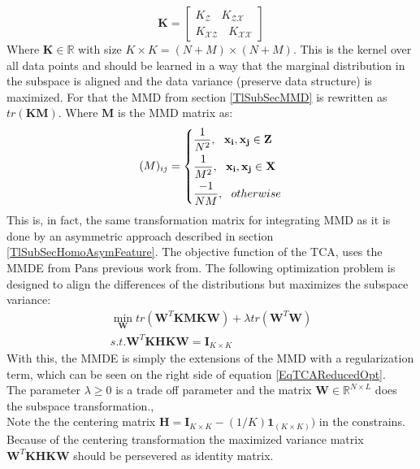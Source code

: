 \begin{equation}\label{EqTCAKernel}
\mathbf{K} = 
	\begin{bmatrix}
	K_{\mathcal{Z}}\>\>\>\> K_{\mathcal{ZX}} \\
	K_{\mathcal{XZ}}\>\>\>\> K_{\mathcal{XX}}
	\end{bmatrix}
\end{equation}
Where $\mathbf{K} \in \mathbb{R}$ with size $K\times K = (N + M) \times (N+ M)$.
This is the kernel over all data points and should be learned in a way that the marginal distribution in the subspace is aligned and the data variance (preserve data structure) is maximized.
For that the \acs{MMD} from section \ref{TlSubSecMMD} is rewritten as $tr(\mathbf{KM})$.
Where $\mathbf{M}$ is the \acs{MMD} matrix as:\cite{Pan.2011}
\begin{equation}\label{EqTCAMMD}
(M)_{ij}= \begin{dcases}
\frac{1}{N^2},\>\>\> \mathbf{x_i},\mathbf{x_j} \in \mathbf{Z}\\
\frac{1}{M^2},\>\>\> \mathbf{x_i},\mathbf{x_j} \in \mathbf{X}\\
\frac{-1}{NM},\>\>\> otherwise
\end{dcases}
\end{equation}
This is, in fact, the same transformation matrix for integrating \acs{MMD} as it is done by an asymmetric approach described in section \ref{TlSubSecHomoAsymFeature}.
The objective function of the \acs{TCA}, uses the \ac{MMDE} from Pans previous work from\cite{Pan.2008}. The following optimization problem is designed to align the differences of the distributions but maximizes the subspace variance:\cite{Pan.2011}
\begin{equation}\label{EqTCAReducedOpt}
\begin{gathered}
\min_{\mathbf{W}}  tr(\mathbf{W}^T\mathbf{KMKW}) + \lambda tr(\mathbf{W}^T\mathbf{W})\\
s.t. \mathbf{W}^T\mathbf{KHKW} = \mathbf{I}_{K \times K}
\end{gathered}
\end{equation}
With this, the \acs{MMDE} is simply the extensions of the \acl{MMD} with a regularization term, which can be seen on the right side of equation \eqref{EqTCAReducedOpt}.\cite{Pan.2011}\\
The parameter $\lambda \ge 0$ is a trade off parameter and the matrix $\mathbf{W} \in \mathbb{R}^{N\times L}$ does the subspace transformation.\cite{Pan.2011},\\
Note the the centering matrix $\mathbf{H} = \mathbf{I}_{K\times K} - (1/K)\mathbf{1}_{(K\times K)})$ in the constrains. Because of the centering transformation the maximized variance matrix $\mathbf{W}^T\mathbf{KHKW}$ should be persevered as identity matrix.\\
